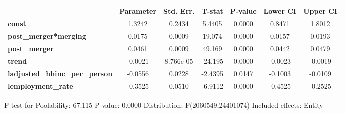 \documentclass{report}
\begin{document}
\begin{center}
\begin{tabular}{lclc}
\bottomrule
\end{tabular}
\begin{tabular}{lcccccc}
                                       & \textbf{Parameter} & \textbf{Std. Err.} & \textbf{T-stat} & \textbf{P-value} & \textbf{Lower CI} & \textbf{Upper CI}  \\
\midrule
\textbf{const}                         &       1.3242       &       0.2434       &      5.4405     &      0.0000      &       0.8471      &       1.8012       \\
\textbf{post\_merger*merging}          &       0.0175       &       0.0009       &      19.074     &      0.0000      &       0.0157      &       0.0193       \\
\textbf{post\_merger}                  &       0.0461       &       0.0009       &      49.169     &      0.0000      &       0.0442      &       0.0479       \\
\textbf{trend}                         &      -0.0021       &     8.766e-05      &     -24.195     &      0.0000      &      -0.0023      &      -0.0019       \\
\textbf{ladjusted\_hhinc\_per\_person} &      -0.0556       &       0.0228       &     -2.4395     &      0.0147      &      -0.1003      &      -0.0109       \\
\textbf{lemployment\_rate}             &      -0.3525       &       0.0510       &     -6.9112     &      0.0000      &      -0.4525      &      -0.2525       \\
\bottomrule
\end{tabular}
\end{center}

F-test for Poolability: 67.115 \newline
 P-value: 0.0000 \newline
 Distribution: F(2060549,24401074) \newline
  \newline
 Included effects: Entity
\end{document}

